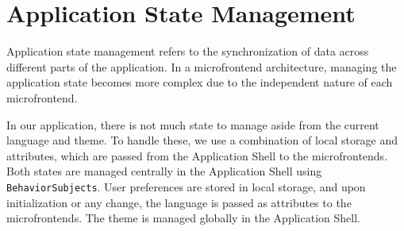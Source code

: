 \section{Application State Management}
Application state management refers to the synchronization of data across different parts of the application. In a microfrontend architecture, managing the application state becomes more complex due to the independent nature of each microfrontend.

In our application, there is not much state to manage aside from the current language and theme. To handle these, we use a combination of local storage and attributes, which are passed from the Application Shell to the microfrontends. Both states are managed centrally in the Application Shell using \texttt{BehaviorSubjects}. User preferences are stored in local storage, and upon initialization or any change, the language is passed as attributes to the microfrontends. The theme is managed globally in the Application Shell.